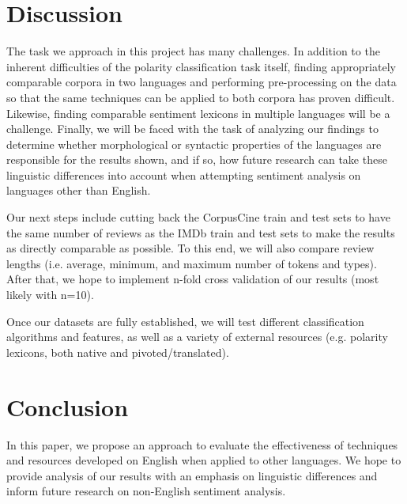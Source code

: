 \documentclass[11pt]{article}
\begin{document}
\section{Discussion}

The task we approach in this project has many challenges.  In addition to the inherent difficulties of the polarity classification task itself, finding appropriately comparable corpora in two languages and performing pre-processing on the data so that the same techniques can be applied to both corpora has proven difficult.  Likewise, finding comparable sentiment lexicons in multiple languages will be a challenge.  Finally, we will be faced with the task of analyzing our findings to determine whether morphological or syntactic properties of the languages are responsible for the results shown, and if so, how future research can take these linguistic differences into account when attempting sentiment analysis on languages other than English.

Our next steps include cutting back the CorpusCine train and test sets to have the same number of reviews as the IMDb train and test sets to make the results as directly comparable as possible.  To this end, we will also compare review lengths (i.e. average, minimum, and maximum number of tokens and types).  After that, we hope to implement n-fold cross validation of our results (most likely with n=10). 

Once our datasets are fully established, we will test different classification algorithms and features, as well as a variety of external resources (e.g. polarity lexicons, both native and pivoted/translated).

\section{Conclusion}

In this paper, we propose an approach to evaluate the effectiveness of techniques and resources developed on English when applied to other languages.  We hope to provide analysis of our results with an emphasis on linguistic differences and inform future research on non-English sentiment analysis.

\nocite{*}




\end{document}
